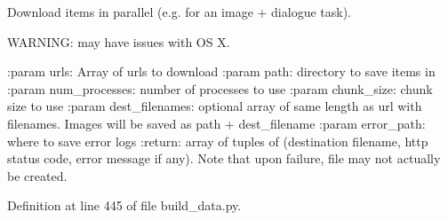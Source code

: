 \begin{DoxyVerb}Download items in parallel (e.g. for an image + dialogue task).

WARNING: may have issues with OS X.

:param urls:
    Array of urls to download
:param path:
    directory to save items in
:param num_processes:
    number of processes to use
:param chunk_size:
    chunk size to use
:param dest_filenames:
    optional array of same length as url with filenames.  Images will be
    saved as path + dest_filename
:param error_path:
    where to save error logs
:return:
    array of tuples of (destination filename, http status code, error
    message if any). Note that upon failure, file may not actually be
    created.
\end{DoxyVerb}
 

Definition at line 445 of file build\+\_\+data.\+py.


